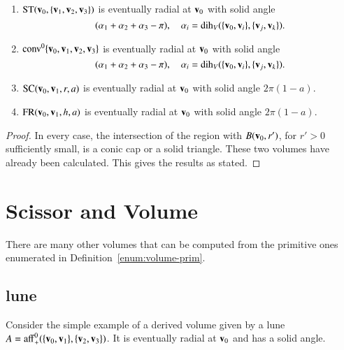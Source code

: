 \begin{lemma} 
\begin{enumerate}
    \item  ${\operatorname{ST}}({\mathbf v}_0,\{{\mathbf v}_1,{\mathbf v}_2,{\mathbf v}_3\})$ is eventually radial at ${\mathbf v}_0$
     with solid angle 
     $$
     (\alpha_1+\alpha_2+\alpha_3-\pi),\quad
     \alpha_i=\operatorname{dih}_V(\{{\mathbf v}_0,{\mathbf v}_i\},\{{\mathbf v}_j,{\mathbf v}_k\}).
     $$
    \item ${\operatorname{conv}}^0\{{\mathbf v}_0,{\mathbf v}_1,{\mathbf v}_2,{\mathbf v}_3\}$ is eventually radial at ${\mathbf v}_0$
      with solid angle
           $$
     (\alpha_1+\alpha_2+\alpha_3-\pi),\quad
     \alpha_i=\operatorname{dih}_V(\{{\mathbf v}_0,{\mathbf v}_i\},\{{\mathbf v}_j,{\mathbf v}_k\}).
     $$
    \item ${\operatorname{SC}}({\mathbf v}_0,{\mathbf v}_1,r,a)$ is eventually radial at ${\mathbf v}_0$ with solid
      angle 
      $2\pi(1-a)$.
    \item ${\operatorname{FR}}({\mathbf v}_0,{\mathbf v}_1,h,a)$ is eventually radial at ${\mathbf v}_0$ with solid
      angle        $2\pi (1-a)$.
%
\end{enumerate}
\end{lemma}
%

%
%
%
%

\begin{proof} In every case, the intersection of 
  the region with $B({\mathbf v}_0,r')$, for $r'>0$ sufficiently small, is
  a conic cap or a solid triangle.  These two volumes have
  already been calculated.  This gives the results as stated.
\end{proof}


\section{Scissor and Volume}

There are many other volumes that can be computed from the
primitive ones enumerated in Definition~\ref{enum:volume-prim}.

\subsection{lune}  
%

Consider the simple example of a derived volume given by a
lune $A={\operatorname{aff}}_+^0(\{{\mathbf v}_0,{\mathbf v}_1\},\{{\mathbf v}_2,{\mathbf v}_3\})$.  It is eventually
radial at ${\mathbf v}_0$ and has a solid angle.
%


